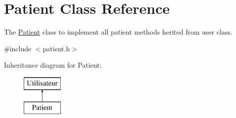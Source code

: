\hypertarget{class_patient}{}\section{Patient Class Reference}
\label{class_patient}


The \mbox{\hyperlink{class_patient}{Patient}} class to implement all patient methods herited from user class.  




{\ttfamily \#include $<$patient.\+h$>$}

Inheritance diagram for Patient\+:\begin{figure}[H]
\begin{center}
\leavevmode
\includegraphics[height=2.000000cm]{class_patient}
\end{center}
\end{figure}
